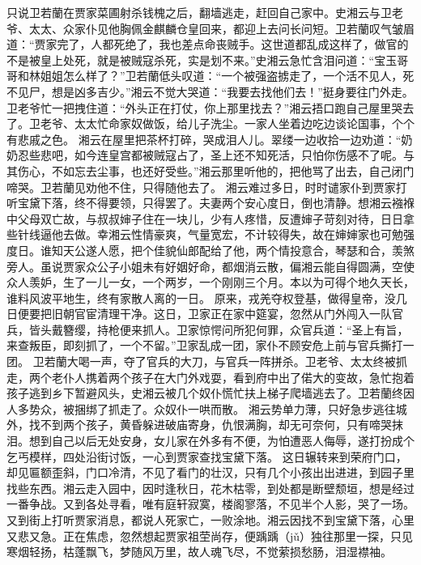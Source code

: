 \documentclass[12pt,oneside]{book}
\begin{document}
只说卫若蘭在贾家菜圃射杀钱槐之后，翻墙逃走，赶回自己家中。史湘云与卫老爷、太太、众家仆见他胸佩金麒麟仓皇回来，都迎上去问长问短。卫若蘭叹气皱眉道：“贾家完了，人都死绝了，我也差点命丧贼手。这世道都乱成这样了，做官的不是被皇上处死，就是被贼寇杀死，实是划不来。”史湘云急忙含泪问道：“宝玉哥哥和林姐姐怎么样了？”卫若蘭低头叹道：“一个被强盗掳走了，一个活不见人，死不见尸，想是凶多吉少。”湘云不觉大哭道：“我要去找他们去！”挺身要往门外走。卫老爷忙一把拽住道：“外头正在打仗，你上那里找去？”湘云捂口跑自己屋里哭去了。卫老爷、太太忙命家奴做饭，给儿子洗尘。一家人坐着边吃边谈论国事，个个有悲戚之色。
湘云在屋里把茶杯打碎，哭成泪人儿。翠缕一边收拾一边劝道：“奶奶忍些悲吧，如今连皇宫都被贼寇占了，圣上还不知死活，只怕你伤感不了呢。与其伤心，不如忘去尘事，也还好受些。”湘云那里听他的，把他骂了出去，自己闭门啼哭。卫若蘭见劝他不住，只得随他去了。
湘云难过多日，时时谴家仆到贾家打听宝黛下落，终不得要领，只得罢了。夫妻两个安心度日，倒也清静。想湘云襁褓中父母双亡故，与叔叔婶子住在一块儿，少有人疼惜，反遭婶子苛刻对待，日日拿些针线逼他去做。幸湘云性情豪爽，气量宽宏，不计较得失，故在婶婶家也可勉强度日。谁知天公遂人愿，把个佳貌仙郎配给了他，两个情投意合，琴瑟和合，羡煞旁人。虽说贾家众公子小姐未有好姻好命，都烟消云散，偏湘云能自得圆满，空使众人羡妒，生了一儿一女，一个两岁，一个刚刚三个月。本以为可得个地久天长，谁料风波平地生，终有家散人离的一日。
原来，戎羌夺权登基，做得皇帝，没几日便要把旧朝官宦清理干净。这日，卫家正在家中筵宴，忽然从门外闯入一队官兵，皆头戴簪缨，持枪便来抓人。卫家惊愕问所犯何罪，众官兵道：“圣上有旨，来查叛臣，即刻抓了，一个不留。”卫家乱成一团，家仆不顾安危上前与官兵撕打一团。
卫若蘭大喝一声，夺了官兵的大刀，与官兵一阵拼杀。卫老爷、太太终被抓走，两个老仆人携着两个孩子在大门外戏耍，看到府中出了偌大的变故，急忙抱着孩子逃到乡下暂避风头，史湘云被几个奴仆慌忙扶上梯子爬墙逃去了。卫若蘭终因人多势众，被捆绑了抓走了。众奴仆一哄而散。
湘云势单力薄，只好急步逃往城外，找不到两个孩子，黄昏躲进破庙寄身，仇恨满胸，却无可奈何，只有啼哭抹泪。想到自己以后无处安身，女儿家在外多有不便，为怕遭恶人侮辱，遂打扮成个乞丐模样，四处沿街讨饭，一心到贾家查找宝黛下落。
这日辗转来到荣府门口，却见匾额歪斜，门口冷清，不见了看门的壮汉，只有几个小孩出出进进，到园子里找些东西。湘云走入园中，因时逢秋日，花木枯零，到处都是断壁颓垣，想是经过一番争战。又到各处寻看，唯有庭轩寂寞，楼阁寥落，不见半个人影，哭了一场。又到街上打听贾家消息，都说人死家亡，一败涂地。湘云因找不到宝黛下落，心里又悲又急。正在焦虑，忽然想起贾家祖茔尚存，便踽踽（jǔ）独往那里一探，只见寒烟轻扬，枯蓬飘飞，梦随风万里，故人魂飞尽，不觉萦损愁肠，泪湿襟袖。
\end{document}
